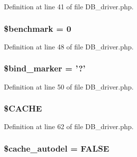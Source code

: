 Definition at line 41 of file D\-B\-\_\-driver.\-php.

\hypertarget{class_c_i___d_b__driver_ac75dbf878e2ceec25d2abe6730855f6b}{
\subsubsection[{\$benchmark}]{\setlength{\rightskip}{0pt plus 5cm}\$benchmark = 0}}\label{class_c_i___d_b__driver_ac75dbf878e2ceec25d2abe6730855f6b}


Definition at line 48 of file D\-B\-\_\-driver.\-php.

\hypertarget{class_c_i___d_b__driver_a253af4ebf23051f23690926079f4285d}{
\subsubsection[{\$bind\-\_\-marker}]{\setlength{\rightskip}{0pt plus 5cm}\$bind\-\_\-marker = '?'}}\label{class_c_i___d_b__driver_a253af4ebf23051f23690926079f4285d}


Definition at line 50 of file D\-B\-\_\-driver.\-php.

\hypertarget{class_c_i___d_b__driver_a54f3ab89da1323e5680116d8e9e94b83}{
\subsubsection[{\$\-C\-A\-C\-H\-E}]{\setlength{\rightskip}{0pt plus 5cm}\$C\-A\-C\-H\-E}}\label{class_c_i___d_b__driver_a54f3ab89da1323e5680116d8e9e94b83}


Definition at line 62 of file D\-B\-\_\-driver.\-php.

\hypertarget{class_c_i___d_b__driver_a3da421c22206e24614dc73c9536ff605}{
\subsubsection[{\$cache\-\_\-autodel}]{\setlength{\rightskip}{0pt plus 5cm}\$cache\-\_\-autodel = F\-A\-L\-S\-E}}\label{class_c_i___d_b__driver_a3da421c22206e24614dc73c9536ff605}


